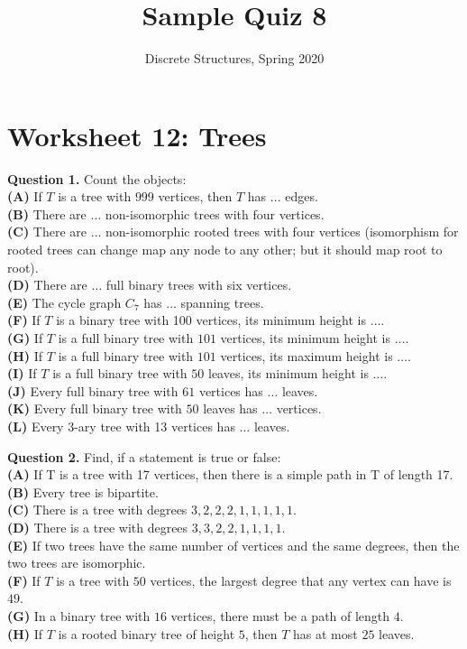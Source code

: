 \documentclass[jou]{apa6}
\title{Sample Quiz 8}
\author{Discrete Structures, Spring 2020}
\affiliation{RBS}
\begin{document}

\twocolumn
\section{Worksheet 12: Trees}

{\bf Question 1.} Count the objects:\\
{\bf (A)} If $T$ is a tree with $999$ vertices, then $T$ has $\ldots$ edges.\\
{\bf (B)} There are $\ldots$ non-isomorphic trees with four vertices.\\
{\bf (C)} There are $\ldots$ non-isomorphic rooted trees with four vertices (isomorphism 
for rooted trees can change map any node to any other; but it should map root to root).\\
{\bf (D)} There are $\ldots$ full binary trees with six vertices.\\
{\bf (E)} The cycle graph $C_7$ has $\ldots$ spanning trees.\\
{\bf (F)} If $T$ is a binary tree with 100 vertices, its minimum height is $\ldots$.\\
{\bf (G)} If $T$ is a full binary tree with $101$ vertices, its minimum height is $\ldots$.\\
{\bf (H)} If $T$ is a full binary tree with $101$ vertices, its maximum height is $\ldots$.\\
{\bf (I)} If $T$ is a full binary tree with $50$ leaves, its minimum height is $\ldots$.\\
{\bf (J)} Every full binary tree with $61$ vertices has $\ldots$ leaves.\\
{\bf (K)} Every full binary tree with $50$ leaves has $\ldots$ vertices.\\
{\bf (L)} Every 3-ary tree with 13 vertices has $\ldots$ leaves.

\vspace{10pt}
{\bf Question 2.} Find, if a statement is true or false:\\
{\bf (A)} If T is a tree with 17 vertices, then there is a simple path in T of length 17.\\
{\bf (B)} Every tree is bipartite.\\
{\bf (C)} There is a tree with degrees $3, 2, 2, 2, 1, 1, 1, 1, 1$.\\
{\bf (D)} There is a tree with degrees $3, 3, 2, 2, 1, 1, 1, 1$.\\
{\bf (E)} If two trees have the same number of vertices and the same degrees, then the two trees are isomorphic.\\
{\bf (F)} If $T$ is a tree with $50$ vertices, the largest degree that any vertex can have is $49$.\\
{\bf (G)} In a binary tree with $16$ vertices, there must be a path of length $4$.\\
{\bf (H)} If $T$ is a rooted binary tree of height $5$, then $T$ has at most $25$ leaves.
\end{document}
